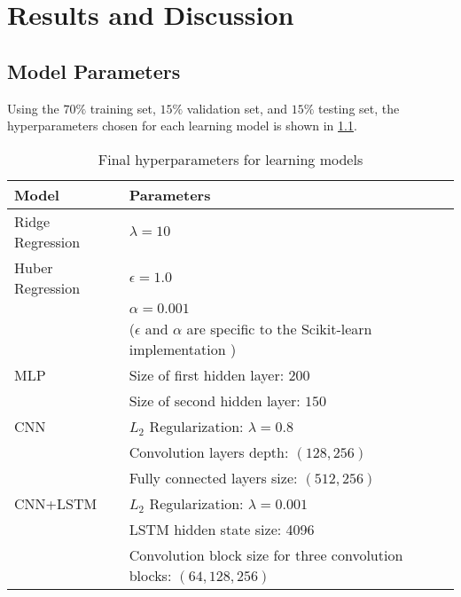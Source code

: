 \chapter{Results and Discussion}

\section{Model Parameters}

Using the $70\%$ training set, $15\%$ validation set, and $15\%$ testing set, the hyperparameters chosen for each learning model is shown in \cref{tab:hyperparam}.

\begin{table}[h]
	\centering
	\caption{Final hyperparameters for learning models}
	\label{tab:hyperparam}
	\begin{tabular}{@{}ll}
		\toprule
		Model                & Parameters                                                                                    \\ \midrule
		Ridge Regression     & $\lambda=10$                                                                                  \\
		Huber Regression     & $\epsilon = 1.0$                                                                              \\
		                     & $\alpha=0.001$                                                                                \\
		                     & ($\epsilon$ and $\alpha$ are specific to the Scikit-learn implementation \cite{scikit-learn}) \\
		\acs{MLP}            & Size of first hidden layer: $200$                                                             \\
		                     & Size of second hidden layer: $150$                                                            \\
		\acs{CNN}            & $L_2$ Regularization: $\lambda=0.8$                                                           \\
		                     & Convolution layers depth: $(128, 256)$                                                        \\
		                     & Fully connected layers size: $(512, 256)$                                                     \\
		\acs{CNN}+\acs{LSTM} & $L_2$ Regularization: $\lambda=0.001$                                                             \\
		                     & \acs{LSTM} hidden state size: 4096                                                            \\
		                     & Convolution block size for three convolution blocks: $(64, 128, 256)$                         \\ \bottomrule
	\end{tabular}
\end{table}

